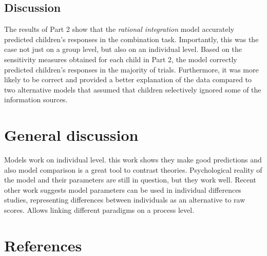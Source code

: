 \documentclass[
  man,floatsintext]{apa6}
\begin{document}
\hypertarget{discussion-1}{%
\subsection{Discussion}\label{discussion-1}}

The results of Part 2 show that the \emph{rational integration} model accurately predicted children's responses in the combination task. Importantly, this was the case not just on a group level, but also on an individual level. Based on the sensitivity measures obtained for each child in Part 2, the model correctly predicted children's responses in the majority of trials. Furthermore, it was more likely to be correct and provided a better explanation of the data compared to two alternative models that assumed that children selectively ignored some of the information sources.

\hypertarget{general-discussion}{%
\section{General discussion}\label{general-discussion}}

Models work on individual level. this work shows they make good predictions and also model comparison is a great tool to contrast theories. Psychological reality of the model and their parameters are still in question, but they work well. Recent other work suggests model parameters can be used in individual differences studies, representing differences between individuals as an alternative to raw scores. Allows linking different paradigms on a process level.

\newpage

\hypertarget{references}{%
\section{References}\label{references}}

\begingroup
\setlength{\parindent}{-0.5in}
\setlength{\leftskip}{0.5in}
\end{document}
